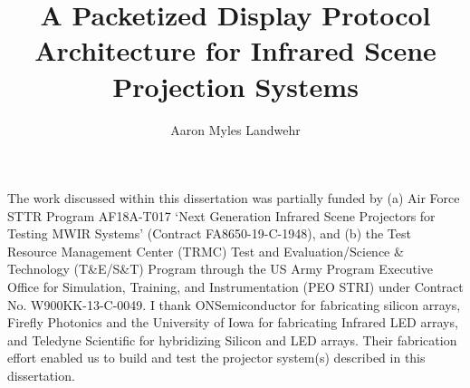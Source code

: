 \documentclass{udthesis}
\begin{document}
    \title[A Packetized Display Protocol Architecture for Infrared Scene Projection Systems]{A Packetized Display Protocol Architecture for Infrared Scene Projection Systems}
    \author{Aaron Myles Landwehr}
    \majorfieldtrue{}
    \subject{Doctor of Philosophy in Electrical and Computer Engineering}

    \maketitlepage

    \begin{approvalpage}
    \end{approvalpage}

    \begin{signedpage} %
    \end{signedpage}

    \begin{front} %
            
            The work discussed within this dissertation was partially funded by (a) Air Force STTR Program AF18A-T017 `Next Generation Infrared Scene Projectors for Testing MWIR Systems' (Contract FA8650-19-C-1948), and (b) the Test Resource Management Center (TRMC) Test and Evaluation/Science \& Technology (T\&E/S\&T) Program through the US Army Program Executive Office for Simulation, Training, and Instrumentation (PEO STRI) under Contract No. W900KK-13-C-0049. I thank ONSemiconductor for fabricating silicon arrays, Firefly Photonics and the University of Iowa for fabricating Infrared LED arrays, and Teledyne Scientific for hybridizing Silicon and LED arrays. Their fabrication effort enabled us to build and test the projector system(s) described in this dissertation.
        \maketocloflot
            
    \end{front}
\end{document}
